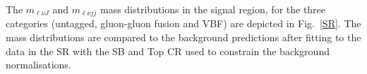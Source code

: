 \newline
The $m_{\ell \nu J}$ and $m_{\ell \nu jj}$ mass distributions in the signal region, for the three categories (untagged, gluon-gluon fusion and VBF) are depicted in Fig.~\ref{SR}. 
The mass distributions are compared to the background
predictions after fitting to the data in the SR with the SB and Top CR used to constrain the
background normalisations. 
\begin{figure}[htbp]
\centering
{}
\\                                             
\end{figure}
